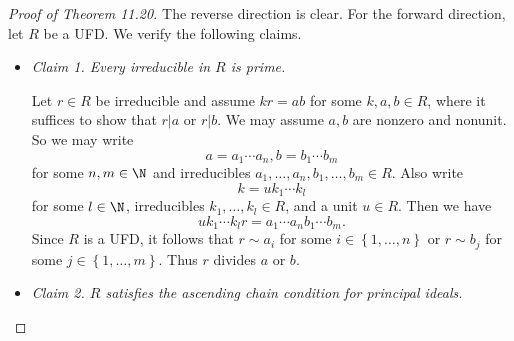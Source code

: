 \documentclass[pmath347]{subfiles}
\begin{document}
    \begin{proof}[Proof of Theorem 11.20]
        The reverse direction is clear. For the forward direction, let $R$ be a UFD. We verify the following claims.
        \begin{itemize}
            \item \textit{Claim 1. Every irreducible in $R$ is prime.}

                \begin{subproof}
                    Let $r\in R$ be irreducible and assume $kr = ab$ for some $k,a,b\in R$, where it suffices to show that $r|a$ or $r|b$. We may assume $a,b$ are nonzero and nonunit. So we may write
                    \begin{equation*}
                        a = a_1\cdots a_n, b=b_1\cdots b_m
                    \end{equation*}
                    for some $n,m\in\N$ and irreducibles $a_1,\ldots,a_n,b_1,\ldots,b_m\in R$. Also write
                    \begin{equation*}
                        k = uk_1\cdots k_l
                    \end{equation*}
                    for some $l\in\N$, irreducibles $k_1,\ldots,k_l\in R$, and a unit $u\in R$. Then we have
                    \begin{equation*}
                        uk_1\cdots k_lr = a_1\cdots a_nb_1\cdots b_m.
                    \end{equation*}
                    Since $R$ is a UFD, it follows that $r\sim a_i$ for some $i\in\left\lbrace 1,\ldots,n \right\rbrace$ or $r\sim b_j$ for some $j\in\left\lbrace 1,\ldots,m \right\rbrace$. Thus $r$ divides $a$ or $b$.
                \end{subproof}

            \item \textit{Claim 2. $R$ satisfies the ascending chain condition for principal ideals.}


\end{itemize}
\end{proof}
\end{document}

